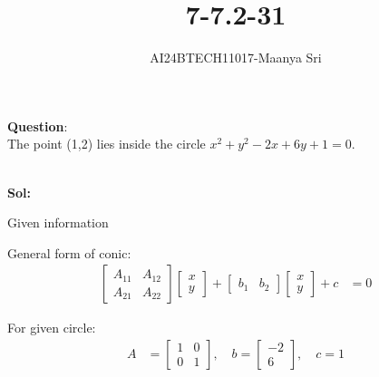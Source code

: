 \documentclass[journal]{IEEEtran}
\begin{document}

\vspace{3cm}

\title{7-7.2-31}
\author{AI24BTECH11017-Maanya Sri
}
{\let\newpage\relax\maketitle}

\renewcommand{\thefigure}{\theenumi}
\renewcommand{\thetable}{\theenumi}
\setlength{\intextsep}{10pt} %


\renewcommand{\thetable}{\theenumi}
\textbf{Question}:\\
The point (1,2) lies inside the circle $x^2 + y^2 - 2x + 6y + 1 = 0$.

\\ \textbf{Sol:}
\begin{table}[h!]
	\centering
	
	\caption{Given information}
	\label{tab7.2.31.1}
\end{table}

 General form of conic:
\begin{align}
[x \quad y] 
\begin{bmatrix}
A_{11} & A_{12} \\
A_{21} & A_{22}
\end{bmatrix}
\begin{bmatrix}
x \\
y
\end{bmatrix}
+ 
\begin{bmatrix}
b_1 & b_2
\end{bmatrix}
\begin{bmatrix}
x \\
y
\end{bmatrix}
+ c &= 0
\end{align}

For given circle:
\begin{align}
A &= 
\begin{bmatrix}
1 & 0 \\
0 & 1
\end{bmatrix}, \quad 
b = 
\begin{bmatrix}
-2 \\
6
\end{bmatrix}, \quad 
c = 1
\end{align}
\end{document}
